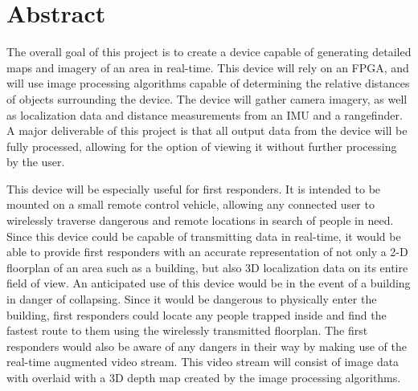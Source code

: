{}
\section*{Abstract}
The overall goal of this project is to create a device capable of generating detailed maps and imagery of an area in real-time. This device will rely on an FPGA, and will use image processing algorithms capable of determining the relative distances of objects surrounding the device. The device will gather camera imagery, as well as localization data and distance measurements from an IMU and a rangefinder.  A major deliverable of this project is that all output data from the device will be fully processed, allowing for the option of viewing it without further processing by the user.
\par
This device will be especially useful for first responders. It is intended to be mounted on a small remote control vehicle, allowing any connected user to wirelessly traverse dangerous and remote locations in search of people in need. Since this device could be capable of transmitting data in real-time, it would be able to provide first responders with an accurate representation of not only a 2-D floorplan of an area such as a building, but also 3D localization data on its entire field of view. An anticipated use of this device would be in the event of a building in danger of collapsing. Since it would be dangerous to physically enter the building, first responders could locate any people trapped inside and find the fastest route to them using the wirelessly transmitted floorplan. The first responders would also be aware of any dangers in their way by making use of the real-time augmented video stream. This video stream will consist of image data with overlaid with a 3D depth map created by the image processing algorithms.